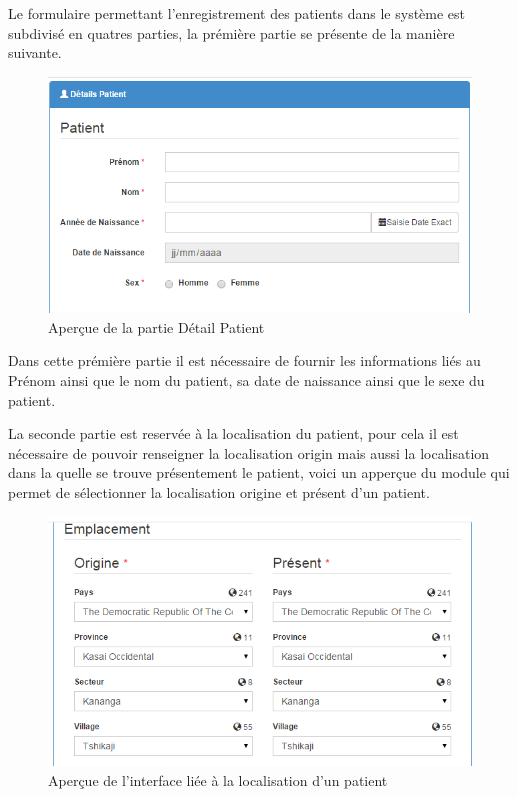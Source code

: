 \documentclass[12pt,a4paper]{report}
\begin{document}
Le formulaire permettant l'enregistrement des patients dans le système est subdivisé en quatres parties, la prémière partie se présente de la manière suivante.

\begin{figure}[h]
\begin{center}
\includegraphics[width=12cm]{pic/DetailPatient.png}
\end{center}
\caption{Aperçue de la partie Détail Patient}
\label{Aperçue de la partie Détail Patient}
\end{figure}

Dans cette prémière partie il est nécessaire de fournir les informations liés au Prénom ainsi que le nom du patient, sa date de naissance ainsi que le sexe du patient.

La seconde partie est reservée à la localisation du patient, pour cela il est nécessaire de pouvoir renseigner la localisation origin mais aussi la localisation dans la quelle se trouve présentement le patient, voici un apperçue du module qui permet de sélectionner la localisation origine et présent d'un patient.

\begin{figure}[h]
\begin{center}
\includegraphics[width=12cm]{pic/EmplacementPatient.png}
\end{center}
\caption{Aperçue de l'interface liée à la localisation d'un patient}
\label{Aperçue de l'interface liée à la localisation d'un patient}
\end{figure}
\end{document}
